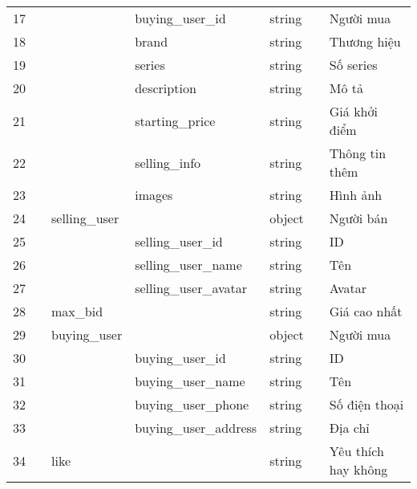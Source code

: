 \documentclass[../DoAn.tex]{subfiles}
\begin{document}
\begin{supertabular}{| p{.05\textwidth} | p{.06\textwidth}| p{.14\textwidth} | p{.25\textwidth} |p{.10\textwidth} | p{.03\textwidth}| p{.19\textwidth} |  }
    17  &  &  & buying\_user\_id & string & & Người mua\\
    18  &  &  & brand & string & & Thương hiệu\\
    19  &  &  & series & string & & Số series\\
    20  &  &  & description & string & & Mô tả\\
    21  &  &  & starting\_price & string & & Giá khởi điểm\\
    22  &  &  & selling\_info & string & & Thông tin thêm\\
    23  &  &  & images & string & & Hình ảnh\\
    24  &  & selling\_user &  & object & & Người bán\\
    25  &  &  & selling\_user\_id & string & & ID\\
    26  &  &  & selling\_user\_name & string & & Tên\\
    27  &  &  & selling\_user\_avatar & string & & Avatar\\
    28  &  & max\_bid & &string& & Giá cao nhất\\
    29  &  & buying\_user &  & object & & Người mua\\
    30  &  &  & buying\_user\_id & string & & ID\\
    31  &  &  & buying\_user\_name & string & & Tên\\
    32  &  &  & buying\_user\_phone & string & & Số điện thoại\\
    33  &  &  & buying\_user\_address & string & & Địa chỉ\\
    34  &  & like &  &string & & Yêu thích hay không\\\hline
    \end{supertabular}
\\
\end{document}
